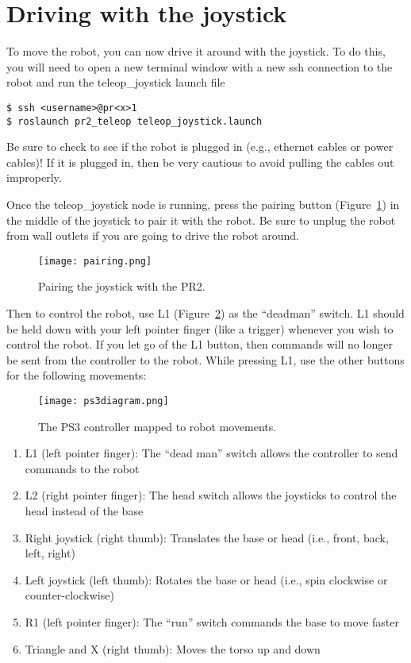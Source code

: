 \section{Driving with the joystick}
To move the robot, you can now drive it around with the joystick.  To do this, you will need to open a new terminal window with a new ssh connection 
to the robot and run the teleop\_joystick launch file
\begin{verbatim}
$ ssh <username>@pr<x>1
$ roslaunch pr2_teleop teleop_joystick.launch 
\end{verbatim}

Be sure to check to see if the robot is plugged in (e.g., ethernet cables or power cables)! If it is plugged in, then be very cautious to avoid pulling the cables out improperly.

Once the teleop\_joystick node is running, press the pairing button (Figure~\ref{fig:ps3_pairing}) in the middle of the 
joystick to pair it with the robot. Be sure to unplug the robot from wall outlets if you are going to drive the robot around. 
\begin{figure}[H]
\centering
\texttt{[image: pairing.png]}
\caption{Pairing the joystick with the PR2.}
\label{fig:ps3_pairing}
\end{figure}
Then to control the robot, use L1 (Figure~\ref{fig:buttons}) as the ``deadman'' switch. L1 should be held down with your left pointer finger (like a trigger) whenever you wish to control the robot. If you let go of the L1 button, then commands will no longer be sent from the controller to the robot. While pressing L1, use the other buttons for the following movements:
\begin{figure}[H]
\centering
\texttt{[image: ps3diagram.png]}
\caption{The PS3 controller mapped to robot movements.}
\label{fig:buttons}
\end{figure}
\begin{enumerate}
\item L1 (left pointer finger): The ``dead man'' switch allows the controller to send commands to the robot
\item L2 (right pointer finger): The head switch allows the joysticks to control the head instead of the base
\item Right joystick (right thumb): Translates the base or head (i.e., front, back, left, right)
\item Left joystick (left thumb): Rotates the base or head (i.e., spin clockwise or counter-clockwise)
\item R1 (left pointer finger): The ``run'' switch commands the base to move faster
\item Triangle and X (right thumb): Moves the torso up and down 
\end{enumerate}

